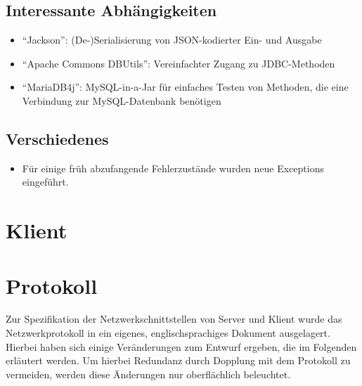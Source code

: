 \documentclass[parskip=full,11pt]{scrartcl}
\begin{document}
\subsection{Interessante Abhängigkeiten}
	\begin{itemize}
		\item \enquote{Jackson}:
			(De-)Serialisierung von JSON-kodierter Ein- und Ausgabe
		\item \enquote{Apache Commons DBUtils}:
			Vereinfachter Zugang zu JDBC-Methoden
		\item \enquote{MariaDB4j}:
			MySQL-in-a-Jar für einfaches Testen von Methoden, die eine
			Verbindung zur MySQL-Datenbank benötigen
	\end{itemize}

\subsection{Verschiedenes}
	\begin{itemize}
	\item Für einige früh abzufangende Fehlerzustände wurden neue Exceptions
		eingeführt.
	\end{itemize}

\pagebreak
\section{Klient}



\pagebreak
\section{Protokoll}

Zur Spezifikation der Netzwerkschnittstellen von Server und Klient wurde das
Netzwerkprotokoll in ein eigenes, englischsprachiges Dokument ausgelagert.
Hierbei haben sich einige Veränderungen zum Entwurf ergeben,
die im Folgenden erläutert werden.
Um hierbei Redundanz durch Dopplung mit dem Protokoll zu vermeiden,
werden diese Änderungen nur oberflächlich beleuchtet.
\end{document}
